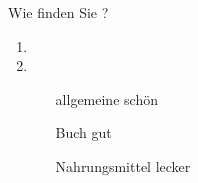 \begin{discourse}{Wie finden Sie \fillhere ?}{}
\begin{enumerate}
	\item {}
	\item {}
		\begin{itemize}
			\item[allgemeine] schön
			\item[Buch] gut
			\item[Nahrungsmittel] lecker
		\end{itemize}
\end{enumerate}
\end{discourse}
